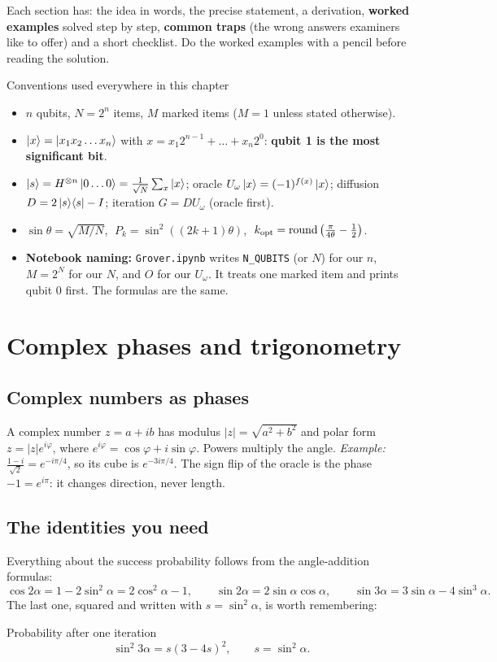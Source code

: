 \documentclass[11pt,a4paper,openany]{book}
\newcommand{\kopt}{k_{\rm opt}}
\newcommand{\proj}[1]{\ket{#1}\!\bra{#1}}
\begin{document}
Each section has: the idea in words, the precise statement, a derivation, \textbf{worked examples} solved step by step,
\textbf{common traps} (the wrong answers examiners like to offer) and a short checklist. Do the worked examples with a
pencil before reading the solution.

\begin{defn}{Conventions used everywhere in this chapter}
\begin{itemize}[leftmargin=1.2em, itemsep=1pt]
\item $n$ qubits, $N = 2^n$ items, $M$ marked items ($M = 1$ unless stated otherwise).
\item $\ket{x} = \ket{x_1x_2\dots x_n}$ with $x = x_1 2^{n-1} + \dots + x_n 2^0$: \textbf{qubit 1 is the most significant bit}.
\item $\ket{s} = H^{\otimes n}\ket{0\dots0} = \frac{1}{\sqrt N}\sum_x\ket{x}$; oracle $U_\omega\ket{x} = (-1)^{f(x)}\ket{x}$; diffusion $D = 2\proj{s} - I$; iteration $G = DU_\omega$ (oracle first).
\item $\sin\theta = \sqrt{M/N}$, $\;P_k = \sin^2((2k+1)\theta)$, $\;\kopt = \operatorname{round}\big(\frac{\pi}{4\theta} - \frac12\big)$.
\item \textbf{Notebook naming:} \texttt{Grover.ipynb} writes \texttt{N\_QUBITS} (or $N$) for our $n$, $M = 2^N$ for our $N$, and $O$ for our $U_\omega$. It treats one marked item and prints qubit 0 first. The formulas are the same.
\end{itemize}
\end{defn}

\section{Complex phases and trigonometry}
\subsection{Complex numbers as phases}
A complex number $z = a + ib$ has modulus $|z| = \sqrt{a^2 + b^2}$ and polar form $z = |z|e^{i\varphi}$, where $e^{i\varphi} = \cos\varphi + i\sin\varphi$. Powers multiply the angle.
\emph{Example:} $\frac{1 - i}{\sqrt2} = e^{-i\pi/4}$, so its cube is $e^{-3i\pi/4}$. The sign flip of the oracle is the phase $-1 = e^{i\pi}$: it changes direction, never length.

\subsection{The identities you need}
Everything about the success probability follows from the angle-addition formulas:
\[ \cos2\alpha = 1 - 2\sin^2\alpha = 2\cos^2\alpha - 1, \qquad \sin2\alpha = 2\sin\alpha\cos\alpha, \qquad \sin3\alpha = 3\sin\alpha - 4\sin^3\alpha. \]
The last one, squared and written with $s = \sin^2\alpha$, is worth remembering:
\begin{keyres}{Probability after one iteration}
\[ \sin^2 3\alpha = s(3 - 4s)^2, \qquad s = \sin^2\alpha. \]
\end{keyres}
\end{document}
